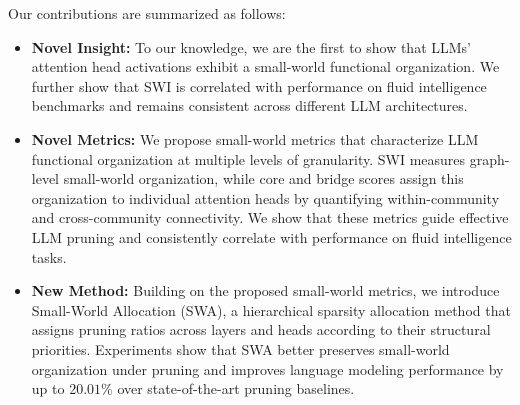 Our contributions are summarized as follows:
\begin{itemize}
    \item \textbf{Novel Insight:} To our knowledge, we are the first to show that LLMs' attention head activations exhibit a small-world functional organization. We further show that SWI is correlated with performance on fluid intelligence benchmarks and remains consistent across different LLM architectures.

   \item \textbf{Novel Metrics:} We propose small-world metrics that characterize LLM functional organization at multiple levels of granularity. SWI measures graph-level small-world organization, while core and bridge scores assign this organization to individual attention heads by quantifying within-community and cross-community connectivity. We show that these metrics guide effective LLM pruning and consistently correlate with performance on fluid intelligence tasks.
    

    \item \textbf{New Method:} Building on the proposed small-world metrics, we introduce Small-World Allocation (SWA), a hierarchical sparsity allocation method that assigns pruning ratios across layers and heads according to their structural priorities. Experiments show that SWA better preserves small-world organization under pruning and improves language modeling performance by up to $20.01\%$ over state-of-the-art pruning baselines.

\end{itemize}










